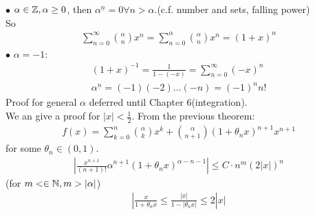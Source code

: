 \documentclass[a4paper]{article}
\begin{document}
\begin{rem}
$\bullet$ $\alpha \in \mathbb{Z}, \alpha \geq 0$, then $\alpha^{\underline{n}} = 0 \forall n > \alpha$.(c.f. number and sets, falling power)\\
So
\begin{equation*}
\begin{aligned}
\sum_{n=0}^\infty {\alpha \choose n} x^n = \sum_{n=0}^\alpha {\alpha \choose n} x^n = \left(1+x\right)^n
\end{aligned}
\end{equation*}
$\bullet$ $\alpha = -1$:
\begin{equation*}
\begin{aligned}
\left(1+x\right)^{-1} = \frac{1}{1-\left(-x\right)} = \sum_{n=0}^\infty \left(-x\right)^n\\
\alpha^{\underline{n}} = \left(-1\right)\left(-2\right)...\left(-n\right) = \left(-1\right)^n n!
\end{aligned}
\end{equation*}
Proof for general $\alpha$ deferred until Chapter 6(integration).\\
We an give a proof for $|x| < \frac{1}{2}$.
From the previous theorem:
\begin{equation*}
\begin{aligned}
f\left(x\right) = \sum_{k=0}^n {\alpha \choose k} x^k + {\alpha \choose n+1} \left(1+\theta_n x\right)^{n+1} x^{n+1}
\end{aligned}
\end{equation*}
for some $\theta_n\in\left(0,1\right)$.
\begin{equation*}
\begin{aligned}
|\frac{x^{n+1}}{\left(n+1\right)!}\alpha^{\underline{n+1}}\left(1+\theta_n x\right)^{\alpha-n-1}| \leq C\cdot n^m \left(2|x|\right)^n
\end{aligned}
\end{equation*}
(for $m<\in \mathbb{N}, m>|\alpha|$)
\begin{equation*}
\begin{aligned}
|\frac{x}{1+\theta_n x} \leq \frac{|x|}{1-|\theta_n x|}\leq 2|x|
\end{aligned}
\end{equation*}
\end{rem}

\newpage
\end{document}

